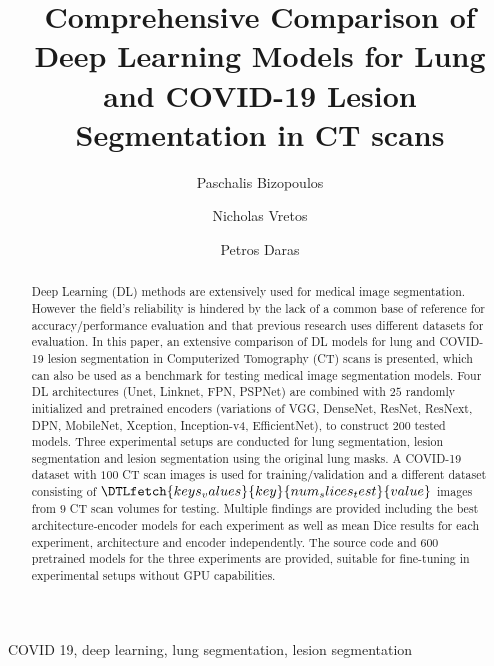 \documentclass{elsarticle}
\begin{document}

\title{Comprehensive Comparison of Deep Learning Models for Lung and COVID-19 Lesion Segmentation in CT scans}
\author[1]{Paschalis Bizopoulos}
\author[1]{Nicholas Vretos}
\author[1]{Petros Daras}

\address[1]{Visual Computing Lab of the Information Technologies Institute, Centre for Research and Technology Hellas, Thessaloniki, Greece e-mail: pbizopoulos@protonmail.com,\{vretos,daras\}@iti.gr}

\begin{abstract}
	Deep Learning (DL) methods are extensively used for medical image segmentation.
	However the field's reliability is hindered by the lack of a common base of reference for accuracy/performance evaluation and that previous research uses different datasets for evaluation.
	In this paper, an extensive comparison of DL models for lung and COVID-19 lesion segmentation in Computerized Tomography (CT) scans is presented, which can also be used as a benchmark for testing medical image segmentation models.
	Four DL architectures (Unet, Linknet, FPN, PSPNet) are combined with $25$ randomly initialized and pretrained encoders (variations of VGG, DenseNet, ResNet, ResNext, DPN, MobileNet, Xception, Inception-v4, EfficientNet), to construct $200$ tested models.
	Three experimental setups are conducted for lung segmentation, lesion segmentation and lesion segmentation using the original lung masks.
	A COVID-19 dataset with $100$ CT scan images is used for training/validation and a different dataset consisting of $\DTLfetch{keys_values}{key}{num_slices_test}{value}$ images from $9$ CT scan volumes for testing.
	Multiple findings are provided including the best architecture-encoder models for each experiment as well as mean Dice results for each experiment, architecture and encoder independently.
	The source code and $600$ pretrained models for the three experiments are provided, suitable for fine-tuning in experimental setups without GPU capabilities.
\end{abstract}

\begin{keyword}
	COVID 19, deep learning, lung segmentation, lesion segmentation
\end{keyword}

\maketitle
\end{document}
